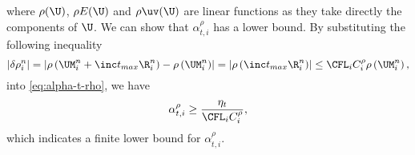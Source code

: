 where $\rho(\U)$, $\rho E(\U)$ and $\rho \uv(\U)$ are linear functions as they take directly the components of $\U$.
We can show that $\alpha_{t,i}^{\rho}$ has a lower bound.
By substituting the following inequality 
\begin{equation}
    |\delta \rho_i^n| = \left|\rho\left(\UM^n_i + \inc t_{max} \R^n_i\right) - \rho\left(\UM^n_i\right)\right|
    =
    \left|\rho\left(\inc t_{max} \R^n_i\right)\right|
    \leq
    \CFL_i C^\rho_i \rho\left(\UM^n_i\right),
\end{equation}
into \eqref{eq:alpha-t-rho}, we have
\begin{equation}
    \label{eq:alpha-t-rho-lb}
    \alpha_{t,i}^{\rho} \geq \frac{\eta_t}{\CFL_i C_i^\rho},
\end{equation}
which indicates a finite lower bound for $\alpha_{t,i}^{\rho}$. 

